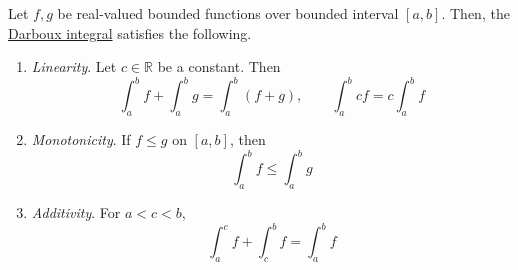   \begin{theorem}
    \label{thm:axiomatic-properties-of-darboux-integral}
    Let $f, g$ be real-valued bounded functions over bounded interval $[a, b]$. Then, the \hyperref[def:riemann-integral]{Darboux integral} satisfies the following. 
    \begin{enumerate}
      \item \textit{Linearity}. Let $c \in \mathbb{R}$ be a constant. Then
        \begin{equation}
          \int_a^b f + \int_a^b g = \int_a^b (f + g), \qquad \int_a^b c f = c \int_a^b f
        \end{equation}
      \item \textit{Monotonicity}. If $f \leq g$ on $[a, b]$, then 
        \begin{equation}
          \int_a^b f \leq \int_a^b g
        \end{equation}
      \item \textit{Additivity}. For $a < c < b$, 
        \begin{equation}
          \int_a^c f + \int_c^b f = \int_a^b f
        \end{equation}
    \end{enumerate}
  \end{theorem}
